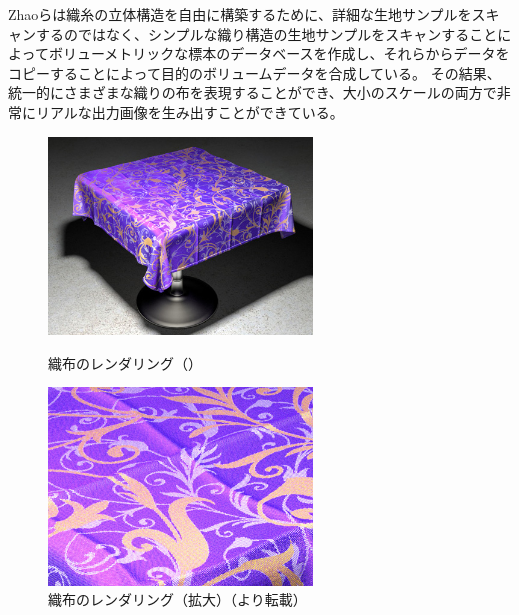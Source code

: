 Zhaoら\cite{zhao2012structure}は織糸の立体構造を自由に構築するために、詳細な生地サンプルをスキャンするのではなく、シンプルな織り構造の生地サンプルをスキャンすることによってボリューメトリックな標本のデータベースを作成し、それらからデータをコピーすることによって目的のボリュームデータを合成している。
その結果、統一的にさまざまな織りの布を表現することができ、大小のスケールの両方で非常にリアルな出力画像を生み出すことができている。


\begin{figure}[htbp]
 \begin{minipage}{0.4\hsize}
  \begin{center}
   \includegraphics[width=70mm]{./img/mft_purple_cloth_ld.jpg}
  \end{center}
  \caption{織布のレンダリング（\cite{zhao2013modular}）}
  \label{FZhao1}
 \end{minipage}
 \begin{minipage}{0.75\hsize}
  \begin{center}
    \includegraphics[width=70mm]{./img/mft_zoom_ld.jpg}
  \end{center}
  \caption{織布のレンダリング（拡大）（\cite{zhao2013modular}より転載）}
  \label{FZhao2}
 \end{minipage}
\end{figure}

